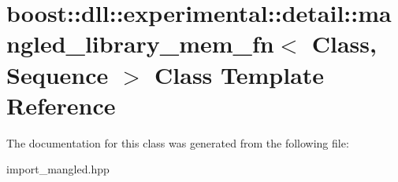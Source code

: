 \hypertarget{a00211}{}\section{boost\+:\+:dll\+:\+:experimental\+:\+:detail\+:\+:mangled\+\_\+library\+\_\+mem\+\_\+fn$<$ Class, Sequence $>$ Class Template Reference}
\label{a00211}


The documentation for this class was generated from the following file\+:\begin{DoxyCompactItemize}
\item 
import\+\_\+mangled.\+hpp\end{DoxyCompactItemize}
